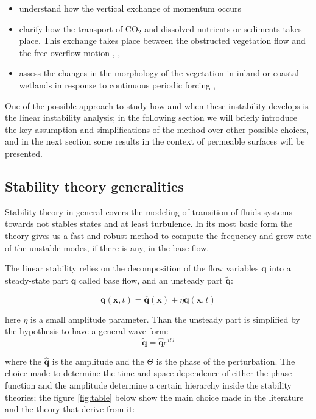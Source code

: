 \begin{itemize}
	\item understand how the vertical exchange of momentum occurs \citet{ikeda1996three}
	\item clarify how the transport of $\text{CO}_2$ and dissolved nutrients or sediments takes place. This exchange takes place between the
	obstructed vegetation flow and the free overflow motion \citet{gambi1990flume}, \citet{eckman1987role}, \citet{grizzle1996hydrodynamically}
	\item assess the changes in the morphology of the vegetation in inland or coastal wetlands in
	response to continuous periodic forcing \citet{asaeda2005morphological}, \citet{patil2010characteristics}
\end{itemize}

One of the possible approach to study how and when these instability develops is the linear instability analysis; in the following section we will briefly introduce the key assumption and simplifications of the method over other possible choices, and in the next section some results in the context of permeable surfaces will be presented.


\subsection{Stability theory generalities}

Stability theory in general covers the modeling of transition of fluids systems towards not stables states and at least turbulence.
In its most basic form the theory gives us a fast and robust method to compute the frequency and grow rate of the unstable modes, if there is any, in the base flow.

The linear stability relies on the decomposition of the flow variables $\mathbf{q}$ into a steady-state part $\overline{\mathbf{q}}$ called base flow, and an unsteady part $\widetilde{\mathbf{q}}$:

$$ \mathbf{q} (\mathbf{x},t)= \overline{\mathbf{q}} (\mathbf{x}) + \eta \widetilde{\mathbf{q}} (\mathbf{x},t) $$

here $\eta$ is a small amplitude parameter.
Than the unsteady part is simplified by the hypothesis to have a general wave form:
$$  \widetilde{\mathbf{q}} =  \widehat{\mathbf{q}} e^{i\Theta} $$

where the $\widehat{\mathbf{q}}$ is the amplitude and the $\Theta$ is the phase of the perturbation.
The choice made to determine the time and space dependence of either the phase function and the amplitude determine a certain hierarchy inside the stability theories; the figure \ref{fig:table} below show the main choice made in the literature and the theory that derive from it:

